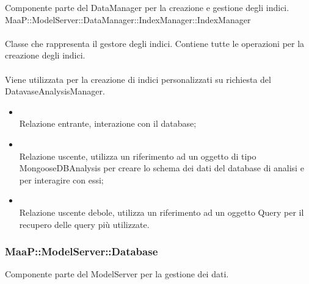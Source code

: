 Componente parte del DataManager per la creazione e gestione degli indici.
	\\
	MaaP::ModelServer::DataManager::IndexManager::IndexManager\\
	\\
	Classe che rappresenta il gestore degli indici. Contiene tutte le operazioni per la creazione degli indici.\\
	\\
	Viene utilizzata per la creazione di indici personalizzati su richiesta del DatavaseAnalysisManager.\\
	\begin{itemize}
	\item{}\\
	Relazione entrante, interazione con il database;
	\item{}\\
	Relazione uscente, utilizza un riferimento ad un oggetto di tipo MongooseDBAnalysis per creare lo schema dei dati del database di analisi e per interagire con essi;
	\item{}\\
	Relazione uscente debole, utilizza un riferimento ad un oggetto Query per il recupero delle query più utilizzate.
	\end{itemize}

\subsubsection{MaaP::ModelServer::Database}
Componente parte del ModelServer per la gestione dei dati.

